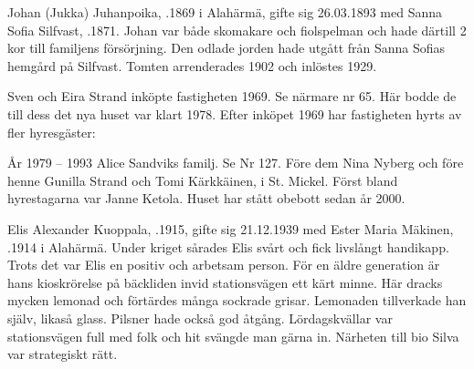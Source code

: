 Johan (Jukka) Juhanpoika, .1869 i Alahärmä, gifte sig 26.03.1893 med Sanna Sofia Silfvast, .1871. Johan var både skomakare och fiolspelman och hade därtill 2 kor till familjens försörjning. Den odlade jorden hade utgått från Sanna Sofias hemgård på Silfvast. Tomten arrenderades 1902 och inlöstes 1929.
\begin{jhchildren}
  \item {}
  \item {}
  \item {}
  \item {}
  \item {}
  \item {}
\end{jhchildren}





Sven och Eira Strand inköpte fastigheten 1969. Se närmare nr 65. Här bodde de till dess det nya huset var klart 1978. Efter inköpet 1969 har fastigheten hyrts av fler hyresgäster:

År 1979 – 1993  Alice Sandviks familj. Se Nr 127. Före dem Nina Nyberg och före henne Gunilla Strand och Tomi Kärkkäinen,  i St. Mickel. Först bland hyrestagarna var Janne Ketola. Huset har stått obebott sedan år 2000.



Elis Alexander Kuoppala, .1915, gifte sig 21.12.1939 med Ester Maria Mäkinen, .1914 i Alahärmä. Under kriget sårades Elis svårt och fick livslångt handikapp. Trots det var Elis en positiv och arbetsam person. För en äldre generation är hans kioskrörelse på bäckliden invid stationsvägen ett kärt minne. Här dracks mycken lemonad och förtärdes många sockrade grisar. Lemonaden tillverkade han själv, likaså glass. Pilsner hade också god åtgång. Lördagskvällar var stationsvägen full med folk och hit svängde man gärna in. Närheten till bio Silva var strategiskt rätt.

